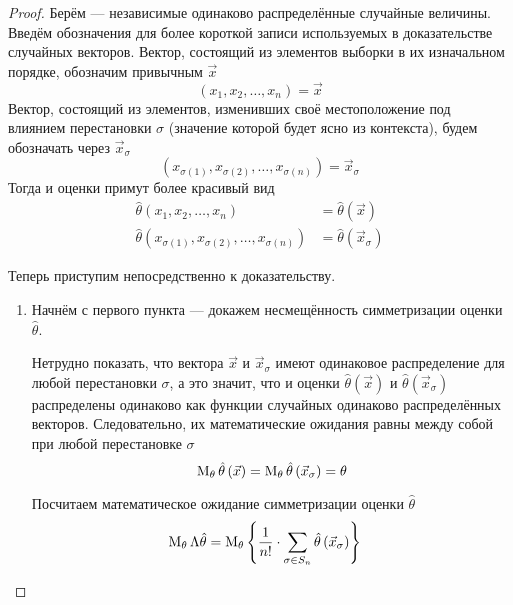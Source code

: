 \begin{proof}
  Берём \xsample --- независимые одинаково распределённые
  случайные величины.
  Введём обозначения для более короткой записи
  используемых в доказательстве случайных векторов.
  Вектор, состоящий из элементов выборки в их изначальном порядке,
  обозначим привычным $\vec{x}$
  \begin{equation*}
    \left(x_1, x_2, \dots, x_n\right) = \vec{x}
  \end{equation*}
  Вектор, состоящий из элементов, изменивших своё местоположение под влиянием
  перестановки $\sigma$ (значение которой будет ясно из контекста),
  будем обозначать через $\vec{x}_\sigma$
  \begin{equation*}
    \left(x_{\sigma\left(1\right)}, x_{\sigma\left(2\right)},
      \dots, x_{\sigma\left(n\right)}\right)= \vec{x}_\sigma
  \end{equation*}
  Тогда и оценки примут более красивый вид
  \begin{align*}
      \hat{\theta}\left(x_1, x_2, \dots, x_n\right)
      &= \hat{\theta}\left(\vec{x}\right)\\
      \hat{\theta}\left(x_{\sigma\left(1\right)},
          x_{\sigma\left(2\right)},
          \dots, x_{\sigma\left(n\right)}\right)
      &= \hat{\theta}\left(\vec{x}_\sigma\right)
  \end{align*}

  Теперь приступим непосредственно к доказательству.
  \begin{enumerate}
      \item
      Начнём с первого пункта --- докажем несмещённость
      симметризации оценки $\hat{\theta}$.

      Нетрудно показать, что  вектора $\vec{x}$ и $\vec{x}_\sigma$
      имеют одинаковое распределение для любой перестановки $\sigma$,
      а это значит, что и оценки $\hat{\theta}\left(\vec{x}\right)$
      и $\hat{\theta}\left(\vec{x}_\sigma\right)$
      распределены одинаково как функции случайных
      одинаково распределённых векторов.
      Следовательно, их математические ожидания равны между собой
      при любой перестановке $\sigma$
      $$\operatorname{M}_{\theta} \hat{\theta}\left(\vec{x}\right)
          = \operatorname{M}_{\theta} \hat{\theta}\left(\vec{x}_\sigma\right)
          = \theta$$

      Посчитаем математическое ожидание симметризации оценки
      $\hat{\theta}$
      \begin{align*}
          \operatorname{M}_{\theta} \Lambda\hat{\theta}
        &= \operatorname{M}_{\theta} 
            \left\{\frac{1}{n!}\cdot\sum_{\sigma\in S_n}
            \hat{\theta}\left(\vec{x}_\sigma\right)\right\}
      \end{align*}


\end{enumerate}
\end{proof}
